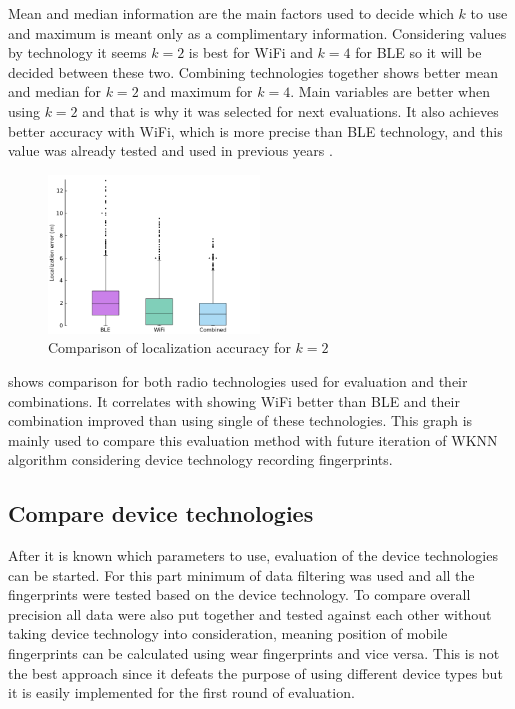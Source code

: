 Mean and median information are the main factors used to decide which $k$ to use and maximum is meant only as a complimentary information. Considering values by technology it seems $k = 2$ is best for WiFi and $k = 4$ for BLE so it will be decided between these two. Combining technologies together shows better mean and median for $k = 2$ and maximum for $k = 4$. Main variables are better when using $k = 2$ and that is why it was selected for next evaluations. It also achieves better accuracy with WiFi, which is more precise than BLE technology, and this value was already tested and used in previous years \cite{IILUBLEB}.

\begin{figure}[h!]
	\begin{centering}
		\includegraphics[width=0.5\textwidth]{img/wknn_errors_classic}
		\par\end{centering}
	\caption{Comparison of localization accuracy for $k = 2$}
	\label{fig04c06}
\end{figure}

 shows comparison for both radio technologies used for evaluation and their combinations. It correlates with  showing WiFi better than BLE and their combination improved than using single of these technologies. This graph is mainly used to compare this evaluation method with future iteration of WKNN algorithm considering device technology recording fingerprints.  

\subsection{Compare device technologies}\label{sec:CompareDeviceTechnologies}
After it is known which parameters to use, evaluation of the device technologies can be started. For this part minimum of data filtering was used and all the fingerprints were tested based on the device technology. To compare overall precision all data were also put together and tested against each other without taking device technology into consideration, meaning position of mobile fingerprints can be calculated using wear fingerprints and vice versa. This is not the best approach since it defeats the purpose of using different device types but it is easily implemented for the first round of evaluation.

